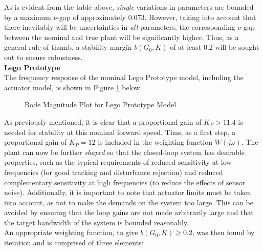 As is evident from the table above, \textit{single} variations in parameters are bounded by a maximum $\nu$-gap of approximately 0.073. However, taking into account that there inevitably  will be uncertainties in \textit{all} parameters, the corresponding $\nu$-gap between the nominal and true plant will be significantly higher. Thus, as a general rule of thumb, a stability margin $b(G_0,K)$ of at least 0.2 will be sought out to ensure robustness. \\

\textbf{Lego Prototype} \\
The frequency response of the nominal Lego Prototype model, including the actuator model, is shown in Figure \ref{fig:bodeLego} below.

\begin{figure}[H]
	\centering
	\caption{Bode Magnitude Plot for Lego Prototype Model}
	\label{fig:bodeLego}
\end{figure}

As previously mentioned, it is clear that a proportional gain of $K_P>11.4$ is needed for stability at this nominal forward speed. Thus, as a first step, a proportional gain of $K_P=12$ is included in the weighting function $W(j\omega)$. The plant can now be further \textit{shaped} so that the closed-loop system has desirable properties, such as the typical requirements of reduced sensitivity at low frequencies (for good tracking and disturbance rejection) and reduced complementary sensitivity at high frequencies (to reduce the effects of sensor noise). Additionally, it is important to note that actuator limits must be taken into account, as not to make the demands on the system too large. This can be avoided by ensuring that the loop gains are not made arbitrarily large and that the target bandwidth of the system is bounded reasonably.  \\

An appropriate weighting function, to give $b(G_0,K) \geq 0.2$, was then found by iteration and is comprised of three elements:

